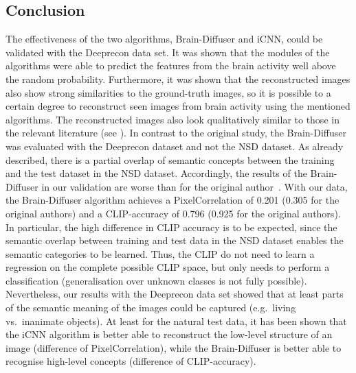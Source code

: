 \subsection{Conclusion}
The effectiveness of the two algorithms, Brain-Diffuser and iCNN, could be validated with the Deeprecon data set. It was shown that the  modules of the algorithms were able to predict the features from the brain activity well above the random probability. Furthermore, it was shown that the reconstructed images also show strong similarities to the ground-truth images, so it is possible to a certain degree to reconstruct seen images from brain activity using the mentioned algorithms. The reconstructed images also look qualitatively similar to those in the relevant literature (see \cite{shenDeepImageReconstruction2019, shirakawaSpuriousReconstructionBrain2024, ozcelikNaturalSceneReconstruction2023}).
In contrast to the original study, the Brain-Diffuser was evaluated with the Deeprecon dataset and not the NSD dataset. As already described, there is a partial overlap of semantic concepts between the training and the test dataset in the NSD dataset. Accordingly, the results of the Brain-Diffuser in our validation are worse than for the original author~\cite{ozcelikNaturalSceneReconstruction2023}. With our data, the Brain-Diffuser algorithm achieves a PixelCorrelation of 0.201 (0.305 for the original authors) and a CLIP-accuracy of 0.796 (0.925 for the original authors). In particular, the high difference in CLIP accuracy is to be expected, since the semantic overlap between training and test data in the NSD dataset enables the semantic categories to be learned. Thus, the CLIP  do not need to learn a regression on the complete possible CLIP space, but only needs to perform a classification (generalisation over unknown classes is not fully possible). 
Nevertheless, our results with the Deeprecon data set showed that at least parts of the semantic meaning of the images could be captured (e.g.\ living vs.\ inanimate objects). At least for the natural test data, it has been shown that the iCNN algorithm is better able to reconstruct the low-level structure of an image (difference of PixelCorrelation), while the Brain-Diffuser is better able to recognise high-level concepts (difference of CLIP-accuracy). 
